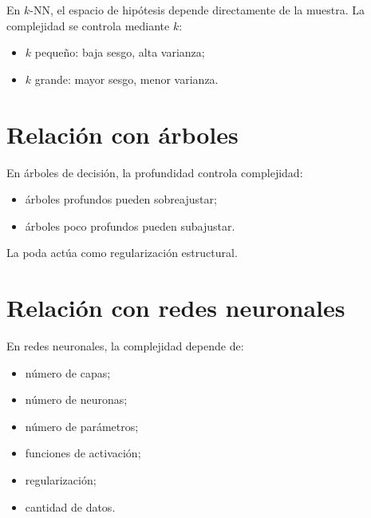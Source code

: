 \documentclass[
  spanish,
  10.5pt,
  letterpaper,
  DIV=11,
  numbers=noendperiod,
  oneside,
  open=any]{scrreprt}
\providecommand{\tightlist}{%
  \setlength{\itemsep}{0pt}\setlength{\parskip}{0pt}}
\theoremstyle{definition}
\theoremstyle{definition}
\theoremstyle{plain}
\theoremstyle{remark}
\begin{document}

En \(k\)-NN, el espacio de hipótesis depende directamente de la muestra.
La complejidad se controla mediante \(k\):

\begin{itemize}
\tightlist
\item
  \(k\) pequeño: baja sesgo, alta varianza;
\item
  \(k\) grande: mayor sesgo, menor varianza.
\end{itemize}

\section*{Relación con árboles}\label{relaciuxf3n-con-uxe1rboles}


En árboles de decisión, la profundidad controla complejidad:

\begin{itemize}
\tightlist
\item
  árboles profundos pueden sobreajustar;
\item
  árboles poco profundos pueden subajustar.
\end{itemize}

La poda actúa como regularización estructural.

\section*{Relación con redes
neuronales}\label{relaciuxf3n-con-redes-neuronales-2}


En redes neuronales, la complejidad depende de:

\begin{itemize}
\tightlist
\item
  número de capas;
\item
  número de neuronas;
\item
  número de parámetros;
\item
  funciones de activación;
\item
  regularización;
\item
  cantidad de datos.
\end{itemize}
\end{document}
